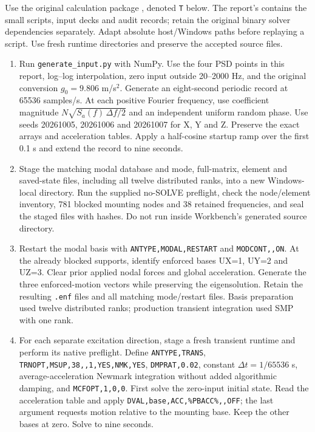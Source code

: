 Use the original calculation package , denoted \texttt{T} below. The report's  contains the small scripts, input decks and audit records; retain the original binary solver dependencies separately. Adapt absolute host/Windows paths before replaying a script. Use fresh runtime directories and preserve the accepted source files.
\begin{enumerate}
\item Run \texttt{generate\_input.py} with NumPy. Use the four PSD points in this report, log--log interpolation, zero input outside 20--2000 Hz, and the original conversion $g_0=9.806$ m/s$^2$. Generate an eight-second periodic record at 65536 samples/s. At each positive Fourier frequency, use coefficient magnitude $N\sqrt{S_a(f)\,\Delta f/2}$ and an independent uniform random phase. Use seeds 20261005, 20261006 and 20261007 for X, Y and Z. Preserve the exact arrays and acceleration tables. Apply a half-cosine startup ramp over the first 0.1 s and extend the record to nine seconds.
\item Stage the matching modal database and mode, full-matrix, element and saved-state files, including all twelve distributed ranks, into a new Windows-local directory. Run the supplied no-SOLVE preflight, check the node/element inventory, 781 blocked mounting nodes and 38 retained frequencies, and seal the staged files with hashes. Do not run inside Workbench's generated source directory.
\item Restart the modal basis with \texttt{ANTYPE,MODAL,RESTART} and \texttt{MODCONT,,ON}. At the already blocked supports, identify enforced bases UX=1, UY=2 and UZ=3. Clear prior applied nodal forces and global acceleration. Generate the three enforced-motion vectors while preserving the eigensolution. Retain the resulting \texttt{.enf} files and all matching mode/restart files. Basis preparation used twelve distributed ranks; production transient integration used SMP with one rank.
\item For each separate excitation direction, stage a fresh transient runtime and perform its native preflight. Define \texttt{ANTYPE,TRANS}, \texttt{TRNOPT,MSUP,38,,1,YES,NMK,YES}, \texttt{DMPRAT,0.02}, constant $\Delta t=1/65536$ s, average-acceleration Newmark integration without added algorithmic damping, and \texttt{MCFOPT,1,0,0}. First solve the zero-input initial state. Read the acceleration table and apply \texttt{DVAL,base,ACC,\%PBACC\%,,OFF}; the last argument requests motion relative to the mounting base. Keep the other bases at zero. Solve to nine seconds.

\end{enumerate}
